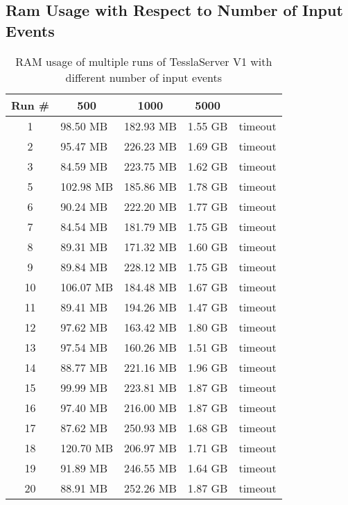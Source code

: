 \clearpage

\subsection{Ram Usage with Respect to Number of Input Events}
\label{sec:appendix:runtime_benchmark_data:ram_usage_events}

\begin{table}[!htb]
  \centering
  \caption{RAM usage of multiple runs of TesslaServer V1 with different number of input events}
  \label{table:tessla_server_v1_events_ram_usage_data}
  \begin{tabular}{cllll}
    Run \# & \multicolumn{1}{c}{500} & \multicolumn{1}{c}{1000} & \multicolumn{1}{c}{5000} \\ \hline
    1 & 98.50 MB  & 182.93 MB & 1.55 GB & timeout \\
    2 & 95.47 MB  & 226.23 MB & 1.69 GB & timeout\\
    3 & 84.59 MB  & 223.75 MB & 1.62 GB & timeout\\
    5 & 102.98 MB & 185.86 MB & 1.78 GB & timeout\\
    6 & 90.24 MB  & 222.20 MB & 1.77 GB & timeout\\
    7 & 84.54 MB  & 181.79 MB & 1.75 GB & timeout\\
    8 & 89.31 MB  & 171.32 MB & 1.60 GB & timeout\\
    9 & 89.84 MB  & 228.12 MB & 1.75 GB & timeout\\
    10 & 106.07 MB & 184.48 MB & 1.67 GB & timeout\\
    11 & 89.41 MB  & 194.26 MB & 1.47 GB & timeout\\
    12 & 97.62 MB  & 163.42 MB & 1.80 GB & timeout\\
    13 & 97.54 MB  & 160.26 MB & 1.51 GB & timeout\\
    14 & 88.77 MB  & 221.16 MB & 1.96 GB & timeout\\
    15 & 99.99 MB  & 223.81 MB & 1.87 GB & timeout\\
    16 & 97.40 MB  & 216.00 MB & 1.87 GB & timeout\\
    17 & 87.62 MB  & 250.93 MB & 1.68 GB & timeout\\
    18 & 120.70 MB & 206.97 MB & 1.71 GB & timeout\\
    19 & 91.89 MB  & 246.55 MB & 1.64 GB & timeout\\
    20 & 88.91 MB  & 252.26 MB & 1.87 GB & timeout
  \end{tabular}
\end{table}

